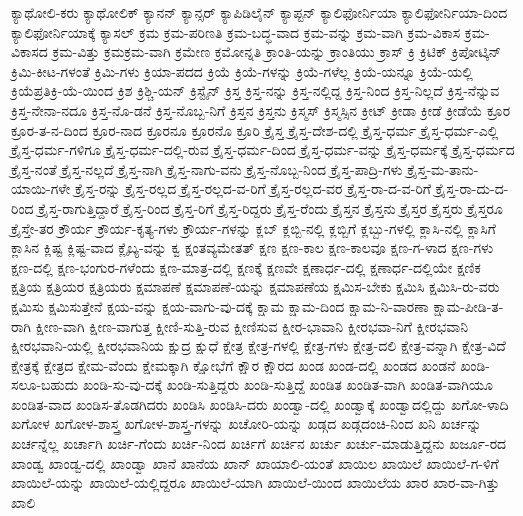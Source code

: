 {ಕ್ಯಾಥೋಲಿ-ಕರು
ಕ್ಯಾಥೋಲಿಕ್
ಕ್ಯಾನನ್
ಕ್ಯಾನ್ಸರ್
ಕ್ಯಾಪಿಡಿಲೈನ್
ಕ್ಯಾಪ್ಟನ್
ಕ್ಯಾಲಿಫೋರ್ನಿಯಾ
ಕ್ಯಾಲಿಫೋರ್ನಿಯಾ-ದಿಂದ
ಕ್ಯಾಲಿಫೋರ್ನಿಯಾಕ್ಕೆ
ಕ್ಯಾಸಲ್
ಕ್ರಮ
ಕ್ರಮ-ಪರಿಣತಿ
ಕ್ರಮ-ಬದ್ಧ-ವಾದ
ಕ್ರಮ-ವನ್ನು
ಕ್ರಮ-ವಾಗಿ
ಕ್ರಮ-ವಿಕಾಸ
ಕ್ರಮ-ವಿಕಾಸದ
ಕ್ರಮ-ವಿತ್ತು
ಕ್ರಮಕ್ರಮ-ವಾಗಿ
ಕ್ರಮೇಣ
ಕ್ರಮೋನ್ನತಿ
ಕ್ರಾಂತಿ-ಯನ್ನು
ಕ್ರಾಂತಿಯು
ಕ್ರಾಸ್
ಕ್ರಿ
ಕ್ರಿಟಿಕ್
ಕ್ರಿಪೋಟ್ಕಿನ್
ಕ್ರಿಮಿ-ಕೀಟ-ಗಳಂತೆ
ಕ್ರಿಮಿ-ಗಳು
ಕ್ರಿಯಾ-ಪದದ
ಕ್ರಿಯೆ
ಕ್ರಿಯೆ-ಗಳನ್ನು
ಕ್ರಿಯೆ-ಗಳೆಲ್ಲ
ಕ್ರಿಯೆ-ಯನ್ನೂ
ಕ್ರಿಯೆ-ಯಲ್ಲಿ
ಕ್ರಿಯೆಪ್ರತಿಕ್ರಿ-ಯೆ-ಯಿಂದ
ಕ್ರಿಶ
ಕ್ರಿಶ್ಚಿ-ಯನ್
ಕ್ರಿಸ್ಟೈನ್
ಕ್ರಿಸ್ತ
ಕ್ರಿಸ್ತ-ನನ್ನು
ಕ್ರಿಸ್ತ-ನಲ್ಲಿದ್ದ
ಕ್ರಿಸ್ತ-ನಿಂದ
ಕ್ರಿಸ್ತ-ನಿಲ್ಲದೆ
ಕ್ರಿಸ್ತ-ನೆನ್ನುವ
ಕ್ರಿಸ್ತ-ನೇನಾ-ನದೂ
ಕ್ರಿಸ್ತ-ನೊ-ಡನೆ
ಕ್ರಿಸ್ತ-ನೊಬ್ಬ-ನಿಗೆ
ಕ್ರಿಸ್ತನ
ಕ್ರಿಸ್ತನು
ಕ್ರಿಸ್ಮಸ್
ಕ್ರಿಸ್ಮಸ್ಸಿನ
ಕ್ರೀಟ್
ಕ್ರೀಡಾ
ಕ್ರೀಡೆ
ಕ್ರೀಡೆಯೆ
ಕ್ರೂರ
ಕ್ರೂರ-ತ-ನ-ದಿಂದ
ಕ್ರೂರ-ನಾದ
ಕ್ರೂರನೂ
ಕ್ರೂರನೊ
ಕ್ರೂರಿ
ಕ್ರೈಸ್ತ
ಕ್ರೈಸ್ತ-ದೇಶ-ದಲ್ಲಿ
ಕ್ರೈಸ್ತ-ಧರ್ಮ
ಕ್ರೈಸ್ತ-ಧರ್ಮ-ಎಲ್ಲಿ
ಕ್ರೈಸ್ತ-ಧರ್ಮ-ಗಳಿಗೂ
ಕ್ರೈಸ್ತ-ಧರ್ಮ-ದಲ್ಲಿ-ರುವ
ಕ್ರೈಸ್ತ-ಧರ್ಮ-ದಿಂದ
ಕ್ರೈಸ್ತ-ಧರ್ಮ-ವನ್ನು
ಕ್ರೈಸ್ತ-ಧರ್ಮಕ್ಕೆ
ಕ್ರೈಸ್ತ-ಧರ್ಮದ
ಕ್ರೈಸ್ತ-ನಂತೆ
ಕ್ರೈಸ್ತ-ನಲ್ಲದೆ
ಕ್ರೈಸ್ತ-ನಾಗಿ
ಕ್ರೈಸ್ತ-ನಾಗು-ವನು
ಕ್ರೈಸ್ತ-ನೊಬ್ಬ-ನಿಂದ
ಕ್ರೈಸ್ತ-ಪಾದ್ರಿ-ಗಳು
ಕ್ರೈಸ್ತ-ಮ-ತಾನು-ಯಾಯಿ-ಗಳೇ
ಕ್ರೈಸ್ತ-ರನ್ನು
ಕ್ರೈಸ್ತ-ರಲ್ಲದ
ಕ್ರೈಸ್ತ-ರಲ್ಲದ-ವ-ರಿಗೆ
ಕ್ರೈಸ್ತ-ರಲ್ಲದ-ವರ
ಕ್ರೈಸ್ತ-ರಾ-ದ-ವ-ರಿಗೆ
ಕ್ರೈಸ್ತ-ರಾ-ದು-ದ-ರಿಂದ
ಕ್ರೈಸ್ತ-ರಾಗುತ್ತಿದ್ದಾರೆ
ಕ್ರೈಸ್ತ-ರಿಂದ
ಕ್ರೈಸ್ತ-ರಿಗೆ
ಕ್ರೈಸ್ತ-ರಿದ್ದರು
ಕ್ರೈಸ್ತ-ರೆಂದು
ಕ್ರೈಸ್ತನ
ಕ್ರೈಸ್ತನು
ಕ್ರೈಸ್ತರ
ಕ್ರೈಸ್ತರು
ಕ್ರೈಸ್ತರೂ
ಕ್ರೈಸ್ತೇ-ತರ
ಕ್ರೌರ್ಯ
ಕ್ರೌರ್ಯ-ಕೃತ್ಯ-ಗಳು
ಕ್ರೌರ್ಯ-ಗಳನ್ನು
ಕ್ಲಬ್
ಕ್ಲಬ್ಬಿ-ನಲ್ಲಿ
ಕ್ಲಬ್ಬಿಗೆ
ಕ್ಲಬ್ಬು-ಗಳಲ್ಲಿ
ಕ್ಲಾಸಿ-ನಲ್ಲಿ
ಕ್ಲಾಸಿಗೆ
ಕ್ಲಾಸಿನ
ಕ್ಲಿಷ್ಟ
ಕ್ಲಿಷ್ಟ-ವಾದ
ಕ್ಲೈಬ್ಯ-ವನ್ನು
ಕ್ವ
ಕ್ಷಂತವ್ಯಮೇತತ್
ಕ್ಷಣ
ಕ್ಷಣ-ಕಾಲ
ಕ್ಷಣ-ಕಾಲವೂ
ಕ್ಷಣ-ಗ-ಳಾದ
ಕ್ಷಣ-ಗಳು
ಕ್ಷಣ-ದಲ್ಲಿ
ಕ್ಷಣ-ಭಂಗುರ-ಗಳೆಂದು
ಕ್ಷಣ-ಮಾತ್ರ-ದಲ್ಲಿ
ಕ್ಷಣಕ್ಕೆ
ಕ್ಷಣವೇ
ಕ್ಷಣಾರ್ಧ-ದಲ್ಲಿ
ಕ್ಷಣಾರ್ಧ-ದಲ್ಲಿಯೇ
ಕ್ಷಣಿಕ
ಕ್ಷತ್ರಿಯ
ಕ್ಷತ್ರಿಯರ
ಕ್ಷತ್ರಿಯರು
ಕ್ಷಮಾಪಣೆ
ಕ್ಷಮಾಪಣೆ-ಯನ್ನು
ಕ್ಷಮಾಪಣೆಯ
ಕ್ಷಮಿಸ-ಬೇಕು
ಕ್ಷಮಿಸಿ
ಕ್ಷಮಿಸಿ-ರು-ವರು
ಕ್ಷಮಿಸು
ಕ್ಷಮಿಸುತ್ತೇನೆ
ಕ್ಷಯ-ವನ್ನು
ಕ್ಷಯ-ವಾಗು-ವು-ದಕ್ಕೆ
ಕ್ಷಾಮ
ಕ್ಷಾಮ-ದಿಂದ
ಕ್ಷಾಮ-ನಿ-ವಾರಣಾ
ಕ್ಷಾಮ-ಪೀಡಿ-ತ-ರಾಗಿ
ಕ್ಷೀಣ-ವಾಗಿ
ಕ್ಷೀಣ-ವಾಗುತ್ತ
ಕ್ಷೀಣಿ-ಸುತ್ತಿ-ರುವ
ಕ್ಷೀಣಿಸುವ
ಕ್ಷೀರ-ಭಾವಾನಿ
ಕ್ಷೀರಭವಾ-ನಿಗೆ
ಕ್ಷೀರಭವಾನಿ
ಕ್ಷೀರಭವಾನಿ-ಯಲ್ಲಿ
ಕ್ಷೀರಭವಾನಿಯ
ಕ್ಷುದ್ರ
ಕ್ಷುಧೆ
ಕ್ಷೇತ್ರ
ಕ್ಷೇತ್ರ-ಗಳಲ್ಲಿ
ಕ್ಷೇತ್ರ-ಗಳು
ಕ್ಷೇತ್ರ-ದಲಿ
ಕ್ಷೇತ್ರ-ವನ್ನಾಗಿ
ಕ್ಷೇತ್ರ-ವಿದೆ
ಕ್ಷೇತ್ರಕ್ಕೆ
ಕ್ಷೇತ್ರದ
ಕ್ಷೇಮ-ವೆಂದು
ಕ್ಷೇಮಕ್ಕಾಗಿ
ಕ್ಷೋಭೆಗೆ
ಕ್ಷೌರ
ಕ್ಷೌರದ
ಖಂಡ
ಖಂಡ-ದಲ್ಲಿ
ಖಂಡದ
ಖಂಡನೆ
ಖಂಡಿ-ಸಲೂ-ಬಹುದು
ಖಂಡಿ-ಸು-ವು-ದಕ್ಕೆ
ಖಂಡಿ-ಸುತ್ತಿದ್ದರು
ಖಂಡಿ-ಸುತ್ತಿದ್ದೆ
ಖಂಡಿತ
ಖಂಡಿತ-ವಾಗಿ
ಖಂಡಿತ-ವಾಗಿಯೂ
ಖಂಡಿತ-ವಾದ
ಖಂಡಿಸ-ತೊಡಗಿದರು
ಖಂಡಿಸಿ
ಖಂಡಿಸಿ-ದರು
ಖಂಡ್ವಾ-ದಲ್ಲಿ
ಖಂಡ್ವಾಕ್ಕೆ
ಖಂಡ್ವಾದಲ್ಲಿದ್ದು
ಖಗೋ-ಳಾದಿ
ಖಗೋಳ
ಖಗೋಳ-ಶಾಸ್ತ್ರ
ಖಗೋಳ-ಶಾಸ್ತ್ರ-ಗಳನ್ನು
ಖಚೋರಿ-ಯನ್ನು
ಖಡ್ಗದ
ಖಡ್ಗದಂಚಿ-ನಿಂದ
ಖನಿ
ಖರ್ಚನ್ನು
ಖರ್ಚನ್ನೆಲ್ಲ
ಖರ್ಚಾಗಿ
ಖರ್ಚಿ-ಗೆಂದು
ಖರ್ಚಿ-ನಿಂದ
ಖರ್ಚಿಗೆ
ಖರ್ಚಿನ
ಖರ್ಚು
ಖರ್ಚು-ಮಾಡುತ್ತಿದ್ದನು
ಖರ್ಜೂ-ರದ
ಖಾಂಡ್ವ
ಖಾಂಡ್ವ-ದಲ್ಲಿ
ಖಾಂಡ್ವಾ
ಖಾನೆ
ಖಾನೆಯ
ಖಾನ್
ಖಾಯಾಲಿ-ಯಂತೆ
ಖಾಯಿಲ
ಖಾಯಿಲೆ
ಖಾಯಿಲೆ-ಗ-ಳಿಗೆ
ಖಾಯಿಲೆ-ಯನ್ನು
ಖಾಯಿಲೆ-ಯಲ್ಲಿದ್ದರೂ
ಖಾಯಿಲೆ-ಯಾಗಿ
ಖಾಯಿಲೆ-ಯಿಂದ
ಖಾಯಿಲೆಯ
ಖಾರ
ಖಾರ-ವಾ-ಗಿತ್ತು
ಖಾಲಿ
}
